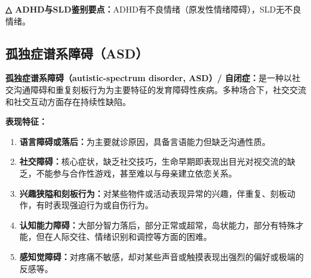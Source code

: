 \begin{exambox}
\textbf{△ ADHD与SLD鉴别要点：}ADHD有不良情绪（原发性情绪障碍），SLD无不良情绪。
\end{exambox}

\subsection{孤独症谱系障碍（ASD）}

\begin{keybox}
\textbf{孤独症谱系障碍（autistic-spectrum disorder, ASD）/ 自闭症：}是一种以社交沟通障碍和重复刻板行为为主要特征的发育障碍性疾病。多种场合下，社交交流和社交互动方面存在持续性缺陷。

\textbf{表现特征：}

\begin{enumerate}[leftmargin=*]
    \item \textbf{语言障碍或落后：}为主要就诊原因，具备言语能力但缺乏沟通性质。
    \item \textbf{社交障碍：}核心症状，缺乏社交技巧，生命早期即表现出目光对视交流的缺乏，不能参与合作性游戏，甚至难以与母亲建立依恋关系。
    \item \textbf{兴趣狭隘和刻板行为：}对某些物件或活动表现异常的兴趣，伴重复、刻板动作，有时表现强迫行为或自伤行为。
    \item \textbf{认知能力障碍：}大部分智力落后，部分正常或超常，岛状能力，部分有特殊才能，但在人际交往、情绪识别和调控等方面的困难。
    \item \textbf{感知觉障碍：}对疼痛不敏感，却对某些声音或触摸表现出强烈的偏好或极端的反感等。
\end{enumerate}
\end{keybox}

